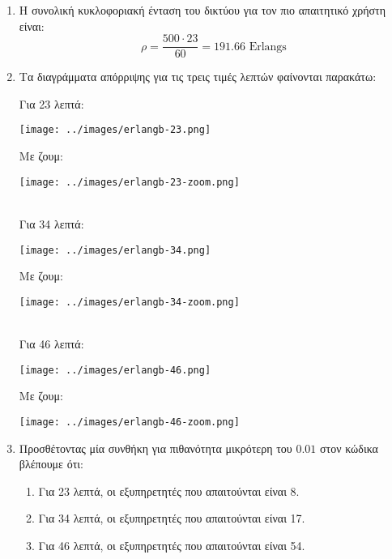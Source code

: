 \documentclass[12pt]{article}
\begin{document}
\begin{enumerate}
    \item{}
        Η συνολική κυκλοφοριακή ένταση του δικτύου για τον πιο απαιτητικό χρήστη είναι:
        \begin{equation}
            \rho = \frac{500 \cdot 23}{60} = 191.66 \text{ Erlangs}
        \end{equation}

    \item{}
        Τα διαγράμματα απόρριψης για τις τρεις τιμές λεπτών φαίνονται παρακάτω:

        Για 23 λεπτά:
        \begin{center}
            \texttt{[image: ../images/erlangb-23.png]}
        \end{center}

        Με ζουμ:
        \begin{center}
            \texttt{[image: ../images/erlangb-23-zoom.png]}
        \end{center}
        \\

        Για 34 λεπτά:
        \begin{center}
            \texttt{[image: ../images/erlangb-34.png]}
        \end{center}

        Με ζουμ:
        \begin{center}
            \texttt{[image: ../images/erlangb-34-zoom.png]}
        \end{center}
        \\


        Για 46 λεπτά:
        \begin{center}
            \texttt{[image: ../images/erlangb-46.png]}
        \end{center}

        Με ζουμ:
        \begin{center}
            \texttt{[image: ../images/erlangb-46-zoom.png]}
        \end{center}

    \item{}
        Προσθέτοντας μία συνθήκη για πιθανότητα μικρότερη του $0.01$ στον κώδικα βλέπουμε ότι:

        \begin{enumerate}
            \item{}
                Για 23 λεπτά, οι εξυπηρετητές που απαιτούνται είναι 8.

            \item{}
                Για 34 λεπτά, οι εξυπηρετητές που απαιτούνται είναι 17.

            \item{}
                Για 46 λεπτά, οι εξυπηρετητές που απαιτούνται είναι 54.
        \end{enumerate}
\end{enumerate}
\end{document}
